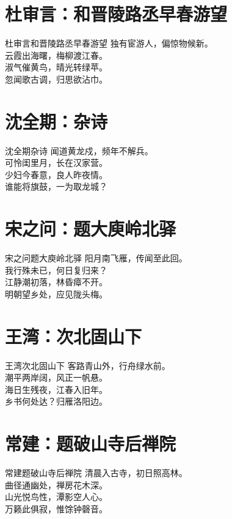 \documentclass[12pt,oneside,a5paper]{book}
\begin{document}
\chapter{杜审言：和晋陵路丞早春游望}
\begin{poemzh}{杜审言}{和晋陵路丞早春游望}
独有宦游人，偏惊物候新。\\
云霞出海曙，梅柳渡江春。\\
淑气催黄鸟，晴光转绿苹。\\
忽闻歌古调，归思欲沾巾。\\ 
\end{poemzh}

\chapter{沈全期：杂诗}
\begin{poemzh}{沈全期}{杂诗}
闻道黄龙戍，频年不解兵。\\
可怜闺里月，长在汉家营。\\
少妇今春意，良人昨夜情。\\
谁能将旗鼓，一为取龙城？\\ 
\end{poemzh}

\chapter{宋之问：题大庾岭北驿}
\begin{poemzh}{宋之问}{题大庾岭北驿}
阳月南飞雁，传闻至此回。\\
我行殊未已，何日复归来？\\
江静潮初落，林昏瘴不开。\\
明朝望乡处，应见陇头梅。\\ 
\end{poemzh}

\chapter{王湾：次北固山下}
\begin{poemzh}{王湾}{次北固山下}
客路青山外，行舟绿水前。\\
潮平两岸阔，风正一帆悬。\\
海日生残夜，江春入旧年。\\
乡书何处达？归雁洛阳边。\\ 
\end{poemzh}

\chapter{常建：题破山寺后禅院}
\begin{poemzh}{常建}{题破山寺后禅院}
清晨入古寺，初日照高林。\\
曲径通幽处，禅房花木深。\\
山光悦鸟性，潭影空人心。\\
万籁此俱寂，惟馀钟磬音。\\ 
\end{poemzh}
\end{document}
